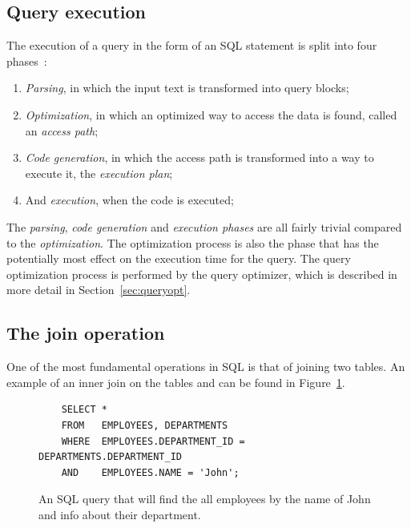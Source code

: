 \subsection{Query execution}
The execution of a query in the form of an SQL statement is split into four
phases~\cite{selinger_1979_access_apsiardms}:
\begin{enumerate}
\item \textit{Parsing}, in which the input text is transformed into query
  blocks;
\item \textit{Optimization}, in which an optimized way to access the data is
  found, called an \textit{access path};
\item \textit{Code generation}, in which the access path is transformed into a way to
  execute it, the \textit{execution plan};
\item And \textit{execution}, when the code is executed;
\end{enumerate}

The \textit{parsing}, \textit{code generation} and \textit{execution phases} are
all fairly trivial compared to the \textit{optimization}. The optimization
process is also the phase that has the potentially most effect on the execution
time for the query. The query optimization process is performed by the query
optimizer, which is described in more detail in Section~\ref{sec:queryopt}.

\subsection{The join operation}
One of the most fundamental operations in SQL is that of joining two tables. An
example of an inner join on the tables  and  can
be found in Figure~\ref{fig:sql:joinop}.

\begin{figure}[ht]
  \begin{verbatim}
    SELECT *
    FROM   EMPLOYEES, DEPARTMENTS
    WHERE  EMPLOYEES.DEPARTMENT_ID = DEPARTMENTS.DEPARTMENT_ID
    AND    EMPLOYEES.NAME = 'John';
  \end{verbatim}
  \caption[An example of an SQL query]{An SQL query that will find the all
    employees by the name of John and info about their
    department.}\label{fig:sql:joinop}
\end{figure}

